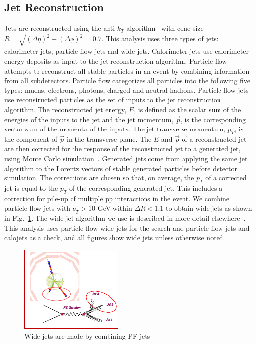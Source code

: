 \subsection{Jet Reconstruction}


Jets are reconstructed using the anti-$k_T$ algorithm~\cite{1126-6708-2008-04-063} with cone size 
$R=\sqrt{(\Delta\eta)^2 + (\Delta\phi)^2}=0.7$.  This analysis uses three types of jets:
calorimeter jets, particle flow jets and wide jets. Calorimeter jets use calorimeter energy deposits as
input to the jet reconstruction algorithm.  Particle flow~\cite{PFT-09-001-PAS} attempts to reconstruct all stable particles in an 
event by combining information from all subdetectors. Particle flow categorizes all particles 
into the following five types: muons, electrons, photons, charged and neutral hadrons. Particle
flow jets use reconstructed particles as the set of inputs to the jet reconstruction algorithm.
The reconstructed jet energy, $E$, is defined as the scalar sum of the energies of the inputs 
to the jet and the jet momentum, $\vec{p}$, is the corresponding vector sum of the momenta of
the inputs. The jet transverse momentum, $p_T$, is the component
of $\vec{p}$ in the transverse plane.
The $E$ and $\vec{p}$ of a reconstructed jet are then corrected for the
response of the reconstructed jet to a generated jet, using Monte Carlo 
simulation~\cite{PAS_JME_10-011}.  
Generated jets come
from applying the same jet algorithm to the Lorentz vectors of stable generated particles before detector simulation.
The corrections are chosen so that, on average, the $p_T$ of a
corrected jet is equal to the $p_T$ of the corresponding generated jet. This 
includes a correction for pile-up of multiple pp interactions in the event.
We combine particle flow jets with $p_T>10$ GeV within $\Delta R<1.1$ to obtain wide jets as 
shown in Fig.~\ref{Wide_definition}.  The wide jet algorithm we use is described in more 
detail elsewhere~\cite{CMS_AN_2011/242}.
This analysis uses particle flow wide jets for the search and particle flow jets and calojets as a check,
and all figures show wide jets unless otherwise noted.


\begin{figure}[!ht]
  \begin{center}
    \includegraphics[width=0.45\textwidth]{Figures/fat_definition.pdf}
    \caption{ Wide jets are made by combining PF jets }
    \label{Wide_definition}
  \end{center}
\end{figure}



